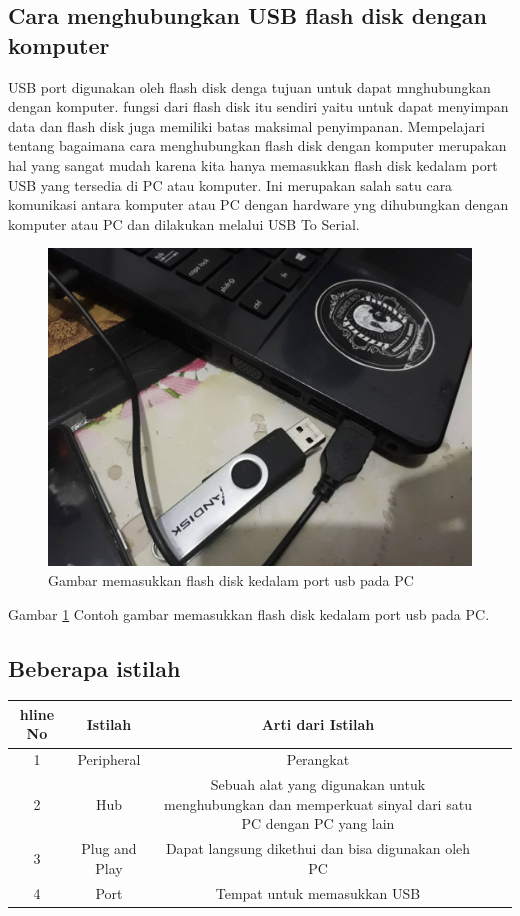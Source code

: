 \begin {enumerate}
\subsection {Cara menghubungkan USB flash disk dengan komputer}
	USB port digunakan oleh flash disk denga tujuan untuk dapat mnghubungkan dengan komputer. fungsi dari flash disk itu sendiri yaitu untuk dapat menyimpan data dan flash disk juga memiliki batas maksimal penyimpanan. Mempelajari tentang bagaimana cara menghubungkan flash disk dengan komputer merupakan hal yang sangat mudah karena kita hanya memasukkan flash disk kedalam port USB yang tersedia di PC atau komputer. Ini merupakan salah satu cara komunikasi antara komputer atau PC dengan hardware yng dihubungkan dengan komputer atau PC dan dilakukan melalui USB To Serial.
	
	\begin{figure}[ht]
	\centerline{\includegraphics[width=1\textwidth]{figures/usb1.jpg}}
	\caption{Gambar memasukkan flash disk kedalam port usb pada PC}
	\label{Gambar}
	\end{figure}
      
      Gambar \ref{Gambar} Contoh gambar memasukkan flash disk kedalam port usb pada PC.
	  
\subsection {Beberapa istilah}	  
\begin{table}[H]
\begin{tabular}{|c|c|c|c|c|}
hline
No & Istilah & Arti dari Istilah\\
\hline
1   & Peripheral & Perangkat\\
2   & Hub & Sebuah alat yang digunakan untuk menghubungkan dan memperkuat sinyal dari satu PC dengan PC yang lain\\
3   & Plug and Play & Dapat langsung dikethui dan bisa digunakan oleh PC\\
4   & Port & Tempat untuk memasukkan USB\\
\hline
\end{tabular}
\end{table}



\end{enumerate}
